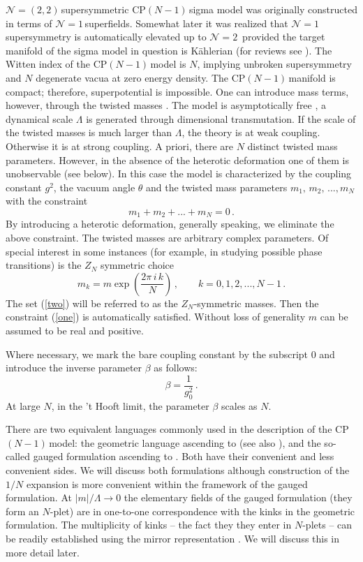\documentclass[epsfig,12pt]{article}
\def\beq{\begin{equation}}
\def\eeq{\end{equation}}
\newcommand{\ntwo}{${\mathcal N}=2\,$}
\newcommand{\none}{${\mathcal N}=1\,$}
\newcommand{\ntt}{${\mathcal N}=(2,2)\,$}
\newcommand{\cpn}{CP$(N-1)\,$}
\def\beq{\begin{equation}}
\def\eeq{\end{equation}}
\begin{document}
\ntt supersymmetric \cpn sigma model was originally constructed 
\cite{orco}
in terms of \none superfields. Somewhat later it was realized \cite{Bruno}
that 
\none supersymmetry is automatically elevated up to \ntwo
provided the target manifold of the sigma model in question is K\"ahlerian (for reviews see \cite{rev1,rev2}).
The Witten index \cite{WI} of the \cpn model is $N$, implying unbroken supersymmetry
and $N$ degenerate vacua at zero energy density.
The \cpn manifold is compact; therefore, superpotential is impossible.
One can introduce mass terms, however, through the twisted masses \cite{twisted}.
The model is asymptotically free \cite{BelPo}, a dynamical scale $\Lambda$ is generated through dimensional transmutation. If the scale of the twisted masses is much larger than $\Lambda$, the theory is at weak coupling.
Otherwise it is at strong coupling. A priori, there are $N$ distinct twisted mass parameters.
However, in the absence of the heterotic deformation one of them is unobservable
(see below). In this case the model is characterized by the coupling constant $g^2$,
the vacuum angle $\theta$ and the twisted mass parameters $m_1,\,m_2,\, ..., m_N$
with the constraint
\beq
m_1 + m_2 + ... +m_N =0\,.
\label{one}
\eeq
By introducing a heterotic deformation, generally speaking, we eliminate the above constraint.
The twisted masses are arbitrary complex parameters. Of special interest 
in some instances (for example, in studying possible phase transitions)
is the $Z_N$ symmetric choice
\beq
m_k = m\exp\left(\frac{2\pi \,i\, k}{N}\right)\,,\qquad k = 0,1,2, ... ,N-1\,.
\label{two}
\eeq
The set (\ref{two}) will be referred to as the $Z_N$-symmetric masses.
Then the constraint
(\ref{one}) is automatically satisfied. Without loss of generality $m$ can be assumed
to be real and positive. 

Where necessary, we mark the bare coupling constant by the subscript 0 and introduce
the inverse parameter $\beta$ as follows:
\beq
\beta = \frac{1}{g_0^2}\,.
\eeq
At large $N$, in the 't Hooft limit,  the parameter $\beta$ scales as $N$.

There are two equivalent languages commonly used in the description of the \cpn model:
the geometric language ascending to \cite{Bruno} (see also \cite{rev2}), and the
so-called gauged formulation ascending to \cite{W79,W93}. Both have their convenient and less convenient sides.
We will discuss both formulations although construction of the $1/N$ expansion is
more convenient within the framework of the gauged formulation. At $|m|/\Lambda \to 0$
the elementary fields of the
gauged formulation (they form an  $N$-plet) are in one-to-one correspondence with the kinks in the geometric formulation.
The multiplicity of kinks -- the fact they they enter in $N$-plets --
can be readily established \cite{adam} using the mirror representation \cite{MR1}. We will discuss this in more detail
later. 
\end{document}
